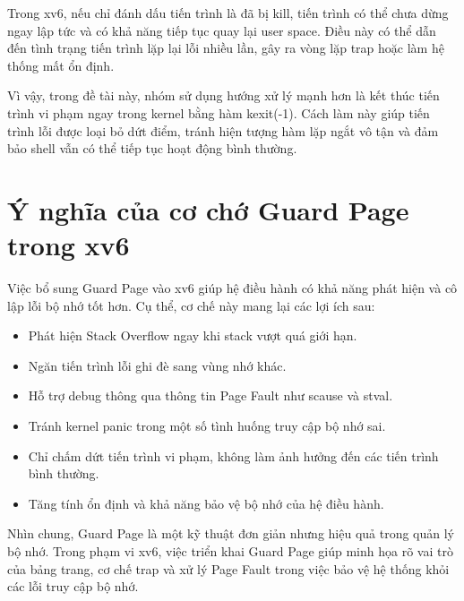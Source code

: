 Trong xv6, nếu chỉ đánh dấu tiến trình là đã bị kill, tiến trình có thể chưa dừng ngay lập tức và có khả năng tiếp tục quay lại user space. Điều này có thể dẫn đến tình trạng tiến trình lặp lại lỗi nhiều lần, gây ra vòng lặp trap hoặc làm hệ thống mất ổn định.

Vì vậy, trong đề tài này, nhóm sử dụng hướng xử lý mạnh hơn là kết thúc tiến trình vi phạm ngay trong kernel bằng hàm kexit(-1). Cách làm này giúp tiến trình lỗi được loại bỏ dứt điểm, tránh hiện tượng hàm lặp ngắt vô tận và đảm bảo shell vẫn có thể tiếp tục hoạt động bình thường.
\section{Ý nghĩa của cơ chớ Guard Page trong xv6}
Việc bổ sung Guard Page vào xv6 giúp hệ điều hành có khả năng phát hiện và cô lập lỗi bộ nhớ tốt hơn. Cụ thể, cơ chế này mang lại các lợi ích sau:
\begin{itemize}
\item Phát hiện Stack Overflow ngay khi stack vượt quá giới hạn.
\item Ngăn tiến trình lỗi ghi đè sang vùng nhớ khác.
\item Hỗ trợ debug thông qua thông tin Page Fault như scause và stval.
\item Tránh kernel panic trong một số tình huống truy cập bộ nhớ sai.
\item Chỉ chấm dứt tiến trình vi phạm, không làm ảnh hưởng đến các tiến trình bình thường.
\item Tăng tính ổn định và khả năng bảo vệ bộ nhớ của hệ điều hành.
\end{itemize}
Nhìn chung, Guard Page là một kỹ thuật đơn giản nhưng hiệu quả trong quản lý bộ nhớ. Trong phạm vi xv6, việc triển khai Guard Page giúp minh họa rõ vai trò của bảng trang, cơ chế trap và xử lý Page Fault trong việc bảo vệ hệ thống khỏi các lỗi truy cập bộ nhớ.